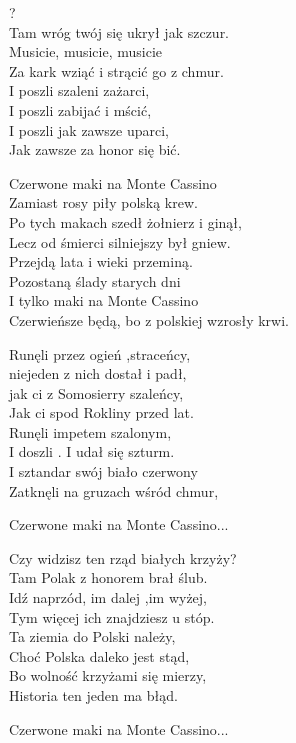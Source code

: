 \documentclass[12pt,a4paper,twoside]{songbook}
\begin{document}
\begin{lyrics}[longestline={Czerwieńsze będą, bo z polskiej wzrosły krwi.}]
?\\
Tam wróg twój się ukrył jak szczur.\\
Musicie, musicie, musicie\\
Za kark wziąć i strącić go z chmur.\\
I poszli szaleni zażarci,\\
I poszli zabijać i mścić,\\
I poszli jak zawsze uparci,\\
Jak zawsze za honor się bić.

Czerwone maki na Monte Cassino\\
Zamiast rosy piły polską krew.\\
Po tych makach szedł żołnierz i ginął,\\
Lecz od śmierci silniejszy był gniew.\\
Przejdą lata i wieki przeminą.\\
Pozostaną ślady starych dni\\
I tylko maki na Monte Cassino\\
Czerwieńsze będą, bo z polskiej wzrosły krwi.

Runęli przez ogień ,straceńcy,\\
niejeden z nich dostał i padł,\\
jak ci z Somosierry szaleńcy,\\
Jak ci spod Rokliny przed lat.\\
Runęli impetem szalonym,\\
I doszli . I udał się szturm.\\
I sztandar swój biało czerwony\\
Zatknęli na gruzach wśród chmur,

Czerwone maki na Monte Cassino...

Czy widzisz ten rząd białych krzyży?\\
Tam Polak z honorem brał ślub.\\
Idź naprzód, im dalej ,im wyżej,\\
Tym więcej ich znajdziesz u stóp.\\
Ta ziemia do Polski należy,\\
Choć Polska daleko jest stąd,\\
Bo wolność krzyżami się mierzy,\\
Historia ten jeden ma błąd.

Czerwone maki na Monte Cassino...
\end{lyrics}
\end{document}
